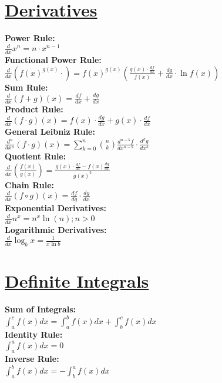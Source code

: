 \documentclass[12pt]{article}
\begin{document}
\section*{\underline{\textbf{Derivatives}}}
\textbf{Power Rule:}
    \\ \( \displaystyle\frac{ d }{ dx } x^n = n \cdot x^{n - 1} \)
\\ \textbf{Functional Power Rule:}
    \\ \( \displaystyle\frac{ d }{ dx } \left( f(x)^{g(x)} \cdot \right) = f(x)^{g(x)} \left( \displaystyle\frac{ g(x) \cdot \frac{ df }{ dx } }{ f(x) } + \displaystyle\frac{ dg }{ dx } \cdot \ln{f(x)} \right) \)
\\ \textbf{Sum Rule:}
    \\ \( \displaystyle\frac{ d }{ dx } (f + g)(x) = \displaystyle\frac{ df }{ dx } + \displaystyle\frac{ dg }{ dx } \)
\\ \textbf{Product Rule:}
    \\ \( \displaystyle\frac{ d }{ dx } (f \cdot g)(x) = f(x) \cdot \displaystyle\frac{ dg }{ dx } + g(x) \cdot \displaystyle\frac{ df }{ dx } \)
\\ \textbf{General Leibniz Rule:}
    \\ \( \displaystyle\frac{ d^n }{ dx^n } (f \cdot g)(x) = \displaystyle\sum_{k = 0}^{n} {\binom{n}{k} \displaystyle\frac{ d^{n - k} f }{ dx^{n - k} }} \cdot \displaystyle\frac{ d^k g }{ dx^k } \)
\\ \textbf{Quotient Rule:}
    \\ \( \displaystyle\frac{ d }{ dx } \left( \displaystyle\frac{ f(x) }{ g(x) } \right) = \displaystyle\frac{ g(x) \cdot \frac{ df }{ dx } - f(x) \frac{ dg }{ dx } }{ g(x)^2 } \)
\\ \textbf{Chain Rule:}
    \\ \( \displaystyle\frac{ d }{ dx } (f \circ g)(x) = \displaystyle\frac{ df }{ dg } \cdot \displaystyle\frac{ dg }{ dx } \)
\\ \textbf{Exponential Derivatives:}
    \\ \( \displaystyle\frac{ d }{ dx } n^x = n^x \ln(n) ; n > 0 \)
\\ \textbf{Logarithmic Derivatives:}
    \\ \( \displaystyle\frac{ d }{ dx } \log_b{x} = \displaystyle\frac{ 1 }{ x \ln b } \)



\section*{\underline{\textbf{Definite Integrals}}}
\textbf{Sum of Integrals:}
    \\ \( \displaystyle\int_{a}^{c} {f(x) dx} = \displaystyle\int_{a}^{b} {f(x) dx} + \displaystyle\int_{b}^{c} {f(x) dx} \)
\\ \textbf{Identity Rule:}
    \\ \( \displaystyle\int_{a}^{a} {f(x) dx} = 0 \)
\\ \textbf{Inverse Rule:}
    \\ \( \displaystyle\int_{a}^{b} {f(x) dx} = - \displaystyle\int_{b}^{a} {f(x) dx} \)
\end{document}
